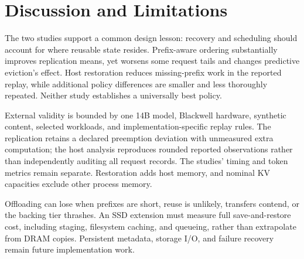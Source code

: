 \section{Discussion and Limitations}
\label{sec:discussion}

The two studies support a common design lesson: recovery and scheduling should account for where reusable state resides.
Prefix-aware ordering substantially improves replication means, yet worsens some request tails and changes predictive eviction's effect.
Host restoration reduces missing-prefix work in the reported replay, while additional policy differences are smaller and less thoroughly repeated.
Neither study establishes a universally best policy.

External validity is bounded by one 14B model, Blackwell hardware, synthetic content, selected workloads, and implementation-specific replay rules.
The replication retains a declared preemption deviation with unmeasured extra computation; the host analysis reproduces rounded reported observations rather than independently auditing all request records.
The studies' timing and token metrics remain separate.
Restoration adds host memory, and nominal KV capacities exclude other process memory.

Offloading can lose when prefixes are short, reuse is unlikely, transfers contend, or the backing tier thrashes.
An SSD extension must measure full save-and-restore cost, including staging, filesystem caching, and queueing, rather than extrapolate from DRAM copies.
Persistent metadata, storage I/O, and failure recovery remain future implementation work.
